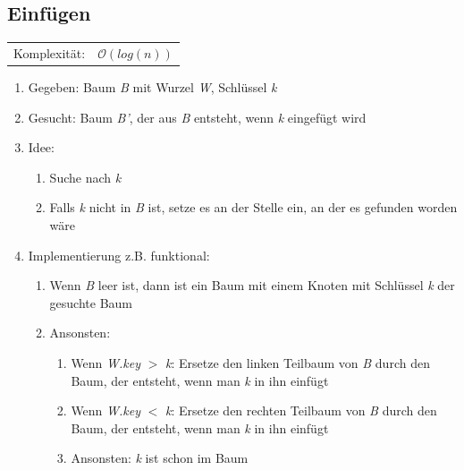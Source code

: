 \documentclass[12pt,a4paper]{article}
\begin{document}
\subsection{Einfügen}\begin{tabularx}{\textwidth}{l l}
	Komplexität: &$\mathcal{O}(log(n))$\\
\end{tabularx}
\begin{enumerate}
	\item Gegeben: Baum \textit{B} mit Wurzel \textit{W}, Schlüssel \textit{k}
	\item Gesucht: Baum \textit{B'}, der aus \textit{B} entsteht, wenn \textit{k} eingefügt wird
	\item Idee:
	\begin{enumerate}
		\item Suche nach \textit{k}
		\item Falls \textit{k} nicht in \textit{B} ist, setze es an der Stelle ein, an der es gefunden worden wäre
	\end{enumerate}
	\item Implementierung z.B. funktional:
	\begin{enumerate}
		\item Wenn \textit{B} leer ist, dann ist ein Baum mit einem Knoten mit Schlüssel \textit{k} der gesuchte Baum
		\item Ansonsten:
		\begin{enumerate}
			\item Wenn \textit{W.key} $>$ \textit{k}: Ersetze den linken Teilbaum von \textit{B} durch den Baum, der entsteht, wenn man \textit{k} in ihn einfügt
			\item Wenn \textit{W.key} $<$ \textit{k}: Ersetze den rechten Teilbaum von \textit{B} durch den Baum, der entsteht, wenn man \textit{k} in ihn einfügt
			\item Ansonsten: \textit{k} ist schon im Baum
		\end{enumerate}
	\end{enumerate}
\end{enumerate}
\end{document}

